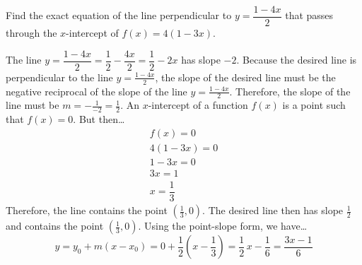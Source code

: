 \documentclass[12pt,letterpaper]{exam}
\begin{document}
\begin{questions}
\newpage
\question[10] Find the exact equation of the line perpendicular to $y= \dfrac{1 - 4x}{2}$ that passes through the $x$-intercept of $f(x)= 4(1 - 3x)$. \pspace

\sol The line $y= \dfrac{1 - 4x}{2}= \dfrac{1}{2} - \dfrac{4x}{2}= \dfrac{1}{2} - 2x$ has slope $-2$. Because the desired line is perpendicular to the line $y= \frac{1 - 4x}{2}$, the slope of the desired line must be the negative reciprocal of the slope of the line $y= \frac{1 - 4x}{2}$. Therefore, the slope of the line must be $m= -\frac{1}{-2}= \frac{1}{2}$. An $x$-intercept of a function $f(x)$ is a point such that $f(x)= 0$. But then\dots
	\[
	\begin{gathered}
	f(x)= 0 \\
	4(1 - 3x)= 0 \\
	1 - 3x= 0 \\
	3x= 1 \\
	x= \dfrac{1}{3}
	\end{gathered}
	\]
Therefore, the line contains the point $(\frac{1}{3}, 0)$. The desired line then has slope $\frac{1}{2}$ and contains the point $(\frac{1}{3}, 0)$. Using the point-slope form, we have\dots
	\[
	y= y_0 + m(x - x_0)= 0 + \dfrac{1}{2} \left(x - \dfrac{1}{3} \right)= \dfrac{1}{2} \, x - \dfrac{1}{6}= \dfrac{3x - 1}{6}
	\]


\end{questions}
\end{document}
